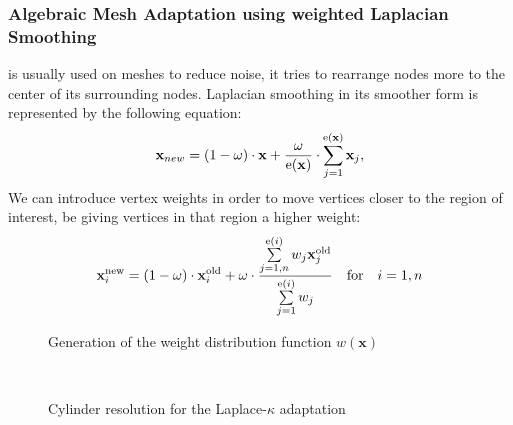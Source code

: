 \begin{frame}
\frametitle{Algebraic Mesh Adaptation using weighted Laplacian Smoothing}
 is usually used on meshes to reduce noise, it tries to rearrange nodes more to the center of its surrounding nodes. Laplacian smoothing in its smoother form is represented by the following equation:
\begin{equation*}
\mathbf{x}_{new} = (1-\omega) \cdot \mathbf{x} + \frac{\omega}{{\rm e}(\mathbf{x})} \cdot \sum\limits_{j=1}^{{\rm e}(\mathbf{x})} \mathbf{x}_j, 
\label{eq:laplace-smoother}
\end{equation*}
We can introduce vertex weights in order to move vertices closer to the region of interest, be giving vertices in that region a higher weight:
\begin{equation*}
\mathbf{x}_{i}^{\rm new} = (1-\omega) \cdot \mathbf{x}_{i}^{\rm old} + \omega \cdot \frac{\sum\limits_{j=1,n}^{{{\rm e}(i)}} w_j \mathbf{x}_j^{\rm old}}{\sum\limits_{j=1}^{{\rm e}(i)} w_j}\quad {\rm for} \quad i=1,n
\end{equation*}
\end{frame}

\begin{frame}
\begin{figure}[h!]
\centering
{}\hspace{0.1cm}
\caption{Generation of the weight distribution function $w(\mathbf{x})$}
\label{fig:monitor_func}
\end{figure}

\end{frame}

\begin{frame}[plain]
\begin{figure}[h!]
  \centering
  \\
  \caption{Cylinder resolution for the Laplace-$\kappa$ adaptation}
  \label{fig:osc-cyl-lap-kappa}
\end{figure}
\end{frame}

